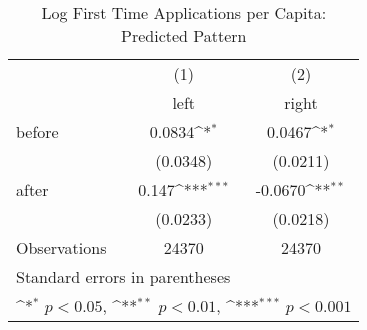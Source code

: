 \begin{table}[htbp]\centering
\def\sym#1{\ifmmode^{#1}\else\(^{#1}\)\fi}
\caption{Log First Time Applications per Capita: Predicted Pattern}
\begin{tabular}{l*{2}{c}}
\hline\hline
                    &\multicolumn{1}{c}{(1)}&\multicolumn{1}{c}{(2)}\\
                    &\multicolumn{1}{c}{left}&\multicolumn{1}{c}{right}\\
\hline
before              &      0.0834\sym{*}  &      0.0467\sym{*}  \\
                    &    (0.0348)         &    (0.0211)         \\
[1em]
after               &       0.147\sym{***}&     -0.0670\sym{**} \\
                    &    (0.0233)         &    (0.0218)         \\
\hline
Observations        &       24370         &       24370         \\
\hline\hline
\multicolumn{3}{l}{\footnotesize Standard errors in parentheses}\\
\multicolumn{3}{l}{\footnotesize \sym{*} \(p<0.05\), \sym{**} \(p<0.01\), \sym{***} \(p<0.001\)}\\
\end{tabular}
\end{table}
